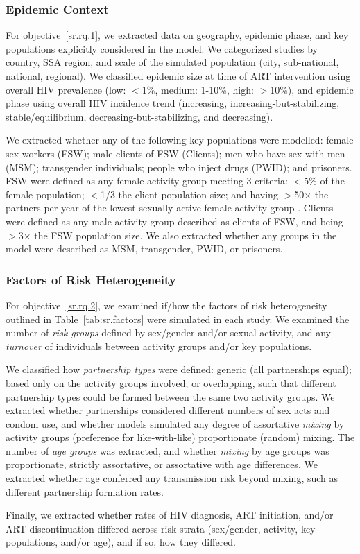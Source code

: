 \subsubsection{Epidemic Context}\label{sr.meth.data.context}
For objective~\ref{sr.rq.1}, we extracted data on
geography, epidemic phase, and key populations explicitly considered in the model.
We categorized studies by country, SSA region, and
scale of the simulated population (city, sub-national, national, regional).
We classified epidemic size at time of ART intervention using
overall HIV prevalence (low: $<$1\%, medium: 1-10\%, high: $>$10\%),
and epidemic phase using overall HIV incidence trend
(increasing, increasing-but-stabilizing, stable/equilibrium, decreasing-but-stabilizing, and decreasing).
\par
We extracted whether any of the following key populations were modelled:
female sex workers (FSW);
male clients of FSW (Clients);
men who have sex with men (MSM);
transgender individuals;
people who inject drugs (PWID);
and prisoners.
FSW were defined as any female activity group meeting 3 criteria:
{$<$5\%} of the female population;
{$<$1/3} the client population size; and
having {$>$50$\times$} the partners per year of
the lowest sexually active female activity group \cite{Vandepitte2006,Scorgie2012}.
Clients were defined as any male activity group
described as clients of FSW, and being {$>$3$\times$} the FSW population size.
We also extracted whether any groups in the model were described as
MSM, transgender, PWID, or prisoners.
\subsubsection{Factors of Risk Heterogeneity}\label{sr.meth.data.factors}
For objective~\ref{sr.rq.2}, we examined if/how
the factors of risk heterogeneity outlined in Table~\ref{tab:sr.factors}
were simulated in each study.
We examined the number of \emph{risk groups} defined by sex/gender and/or sexual activity, and
any \emph{turnover} of individuals between activity groups and/or key populations.
\par
We classified how \emph{partnership types} were defined:
generic (all partnerships equal);
based only on the activity groups involved;
or overlapping, such that different partnership types could be formed between the same two activity groups.
We extracted whether partnerships considered different
numbers of sex acts and condom use,
and whether models simulated any degree of assortative \emph{mixing} by activity groups
(preference for like-with-like) \vs proportionate (random) mixing.
The number of \emph{age groups} was extracted, and whether \emph{mixing} by age groups was
proportionate, strictly assortative, or assortative with age differences.
We extracted whether age conferred any transmission risk beyond mixing,
such as different partnership formation rates.
\par
Finally, we extracted whether rates of HIV diagnosis, ART initiation, and/or ART discontinuation
differed across risk strata (sex/gender, activity, key populations, and/or age),
and if so, how they differed.
